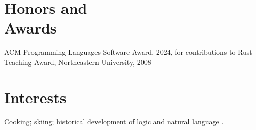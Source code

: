 \documentclass[margin,line,draft]{res}
\newcommand{\mysidestyle}{\sc}
\begin{document}
\begin{resume}
    \section{\mysidestyle Honors and\\Awards} 

    ACM Programming Languages Software Award, 2024, for contributions to Rust\vspace{1mm}\\%
    Teaching Award, Northeastern University, 2008%


    \section{\mysidestyle Interests}

    Cooking; 
    skiing;
    historical development of logic
    and natural language%
    .
\end{resume}
\end{document}
